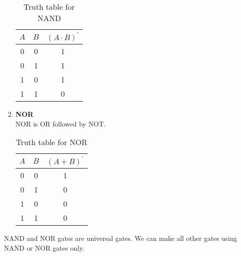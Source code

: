 \documentclass[oneside]{book}
\begin{document}
\begin{enumerate}
\begin{table}[ht]
\begin{tabular}{|cc|c|}
			      \hline
			      $A$ & $B$ & $(A\cdot B)^\prime$ \\
			      \hline
			      0   & 0   & 1                   \\
			      0   & 1   & 1                   \\
			      1   & 0   & 1                   \\
			      1   & 1   & 0                   \\
			      \hline
		      \end{tabular}
		      \caption{Truth table for NAND}
		      \label{truth_table_for_nand}
	      \end{table}
	\item \textbf{NOR}\\
	      NOR is OR followed by NOT.
	      \begin{table}[ht]
		      \centering
		      \begin{tabular}{|cc|c|}
			      \hline
			      $A$ & $B$ & $(A+ B)^\prime$ \\
			      \hline
			      0   & 0   & 1               \\
			      0   & 1   & 0               \\
			      1   & 0   & 0               \\
			      1   & 1   & 0               \\
			      \hline
		      \end{tabular}
		      \caption{Truth table for NOR}
		      \label{truth_table_for_nor}
	      \end{table}
\end{enumerate}

NAND and NOR gates are universal gates. We can make all other gates using NAND or NOR gates only.



\end{document}
